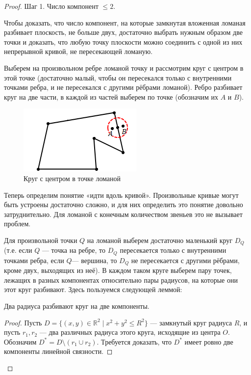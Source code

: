 \begin{proof}
    Шаг 1. Число компонент $\leq 2$.

    Чтобы доказать, что число компонент, на которые замкнутая вложенная ломаная разбивает плоскость, не больше двух, достаточно выбрать нужным образом две точки и доказать, что любую точку плоскости можно соединить с одной из них непрерывной кривой, не пересекающей ломаную.

    Выберем на произвольном ребре ломаной точку и рассмотрим круг с центром в этой точке (достаточно малый, чтобы он пересекался только с внутренними точками ребра, и не пересекался с другими рёбрами ломаной). Ребро разбивает круг на две части, в каждой из частей выберем по точке (обозначим их $A$ и $B$).

    \begin{figure}[h]
        \centering
        \includegraphics{images/c4.1.png}
        \caption{Круг с центром в точке ломаной}
        \label{fig:c4.1}
    \end{figure}

    Теперь определим понятие «идти вдоль кривой». Произвольные кривые могут быть устроены достаточно сложно, и для них определить это понятие довольно затруднительно. Для ломаной с конечным количеством звеньев это не вызывает проблем.

    Для произвольной точки $Q$ на ломаной выберем достаточно маленький круг $D_Q$ (т.е. если $Q$ — точка на ребре, то $D_Q$ пересекается только с внутренними точками ребра, если $Q$— вершина, то $D_Q$ не пересекается с другими рёбрами, кроме двух, выходящих из неё). В каждом таком круге выберем пару точек, лежащих в разных компонентах относительно пары радиусов, на которые они этот круг разбивают. Здесь пользуемся следующей леммой:

    \begin{lemma}
        Два радиуса разбивают круг на две компоненты.
    \end{lemma}
    \begin{proof}
        Пусть $D = \{ (x,y) \in \mathbb{R}^2 \mid x^2 + y^2 \leq R^2 \}$ — замкнутый круг радиуса $R$, и пусть $r_1, r_2$ — два различных радиуса этого круга, исходящие из центра $O$. Обозначим $D^* = D \setminus (r_1 \cup r_2)$. Требуется доказать, что $D^*$ имеет ровно две компоненты линейной связности.


\end{proof}
\end{proof}
